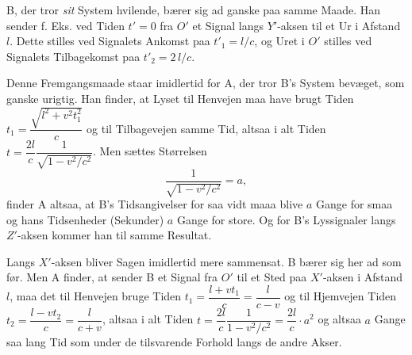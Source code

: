 \documentclass[12pt,a4paper]{article}
\begin{document}
B, der tror \emph{sit} System hvilende, bærer sig ad ganske paa samme Maade.
Han sender f. Eks. ved Tiden $t' = 0$ fra $O'$ et Signal langs $Y'$-aksen til
et Ur i Afstand $l$. Dette stilles ved Signalets Ankomst paa $t'_{1} = l/c$,
og Uret i $O'$ stilles ved Signalets Tilbagekomst paa $t'_{2} = 2\,l/c$.

Denne Fremgangsmaade staar imidlertid for A, der tror B's System bevæget, som
ganske urigtig. Han finder, at Lyset til Henvejen maa have brugt Tiden
$t_{1} = \dfrac{\sqrt{l^{2}+v^{2}t_{1}^{2}}}{c}$ og til Tilbagevejen samme
Tid, altsaa i alt Tiden
$t = \dfrac{2l}{c}\dfrac{1}{\sqrt{1-v^{2}/c^{2}}}$. Men sættes Størrelsen
\begin{equation}\tag*{1.}
  \frac{1}{\sqrt{1-v^{2}/c^{2}}} = a,
\end{equation}
finder A altsaa, at B's Tidsangivelser for saa vidt maaa blive $a$ Gange for
smaa og hans Tidsenheder (Sekunder) $a$ Gange for store. Og for B's
Lyssignaler langs $Z'$-aksen kommer han til samme Resultat.

Langs $X'$-aksen bliver Sagen imidlertid mere sammensat. B bærer sig her ad
som før. Men A finder, at sender B et Signal fra $O'$ til et Sted paa
$X'$-aksen i Afstand $l$, maa det til Henvejen bruge Tiden
$t_{1} = \dfrac{l+vt_{1}}{c} = \dfrac{l}{c-v}$ og til Hjemvejen Tiden
$t_{2} = \dfrac{l-vt_{2}}{c} = \dfrac{l}{c+v}$, altsaa i alt Tiden
$t = \dfrac{2l}{c}\dfrac{1}{1-v^{2}/c^{2}} = \dfrac{2l}{c}\cdot a^{2}$ og
altsaa $a$ Gange saa lang Tid som under de tilsvarende Forhold langs de andre
Akser.
\end{document}
